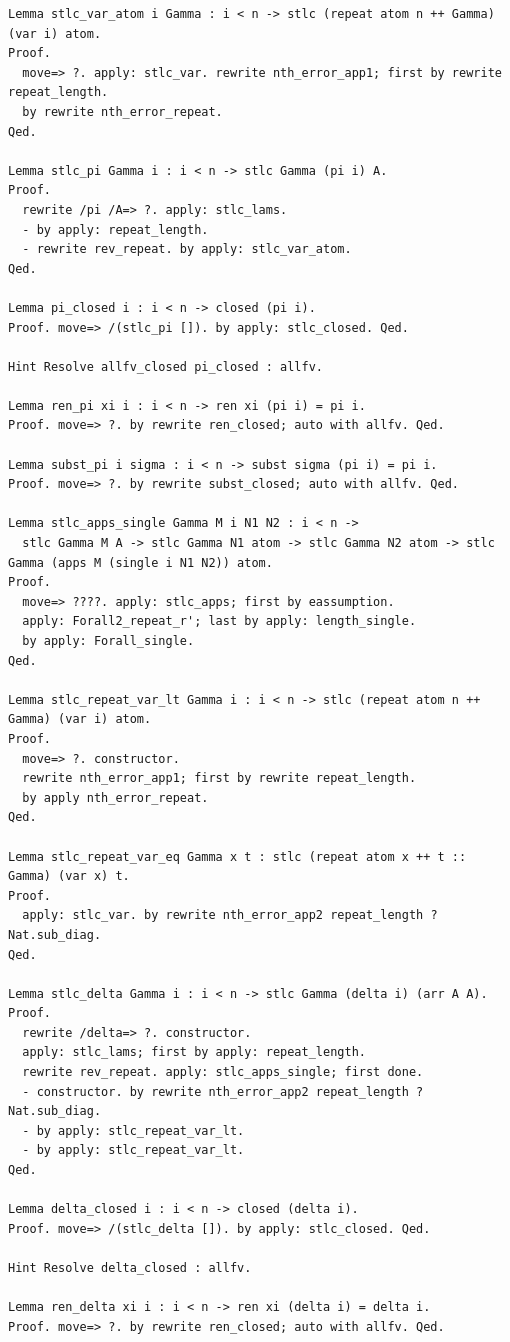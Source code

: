 \begin{lstlisting}
Lemma stlc_var_atom i Gamma : i < n -> stlc (repeat atom n ++ Gamma) (var i) atom.
Proof.
  move=> ?. apply: stlc_var. rewrite nth_error_app1; first by rewrite repeat_length.
  by rewrite nth_error_repeat.
Qed.

Lemma stlc_pi Gamma i : i < n -> stlc Gamma (pi i) A.
Proof.
  rewrite /pi /A=> ?. apply: stlc_lams.
  - by apply: repeat_length.
  - rewrite rev_repeat. by apply: stlc_var_atom.
Qed.

Lemma pi_closed i : i < n -> closed (pi i).
Proof. move=> /(stlc_pi []). by apply: stlc_closed. Qed.

Hint Resolve allfv_closed pi_closed : allfv.

Lemma ren_pi xi i : i < n -> ren xi (pi i) = pi i.
Proof. move=> ?. by rewrite ren_closed; auto with allfv. Qed.

Lemma subst_pi i sigma : i < n -> subst sigma (pi i) = pi i.
Proof. move=> ?. by rewrite subst_closed; auto with allfv. Qed.

Lemma stlc_apps_single Gamma M i N1 N2 : i < n ->
  stlc Gamma M A -> stlc Gamma N1 atom -> stlc Gamma N2 atom -> stlc Gamma (apps M (single i N1 N2)) atom.
Proof.
  move=> ????. apply: stlc_apps; first by eassumption.
  apply: Forall2_repeat_r'; last by apply: length_single.
  by apply: Forall_single.
Qed.

Lemma stlc_repeat_var_lt Gamma i : i < n -> stlc (repeat atom n ++ Gamma) (var i) atom.
Proof.
  move=> ?. constructor.
  rewrite nth_error_app1; first by rewrite repeat_length.
  by apply nth_error_repeat.
Qed.

Lemma stlc_repeat_var_eq Gamma x t : stlc (repeat atom x ++ t :: Gamma) (var x) t.
Proof.
  apply: stlc_var. by rewrite nth_error_app2 repeat_length ?Nat.sub_diag.
Qed.

Lemma stlc_delta Gamma i : i < n -> stlc Gamma (delta i) (arr A A).
Proof.
  rewrite /delta=> ?. constructor.
  apply: stlc_lams; first by apply: repeat_length.
  rewrite rev_repeat. apply: stlc_apps_single; first done.
  - constructor. by rewrite nth_error_app2 repeat_length ?Nat.sub_diag.
  - by apply: stlc_repeat_var_lt.
  - by apply: stlc_repeat_var_lt.
Qed.

Lemma delta_closed i : i < n -> closed (delta i).
Proof. move=> /(stlc_delta []). by apply: stlc_closed. Qed.

Hint Resolve delta_closed : allfv.

Lemma ren_delta xi i : i < n -> ren xi (delta i) = delta i.
Proof. move=> ?. by rewrite ren_closed; auto with allfv. Qed.


\end{lstlisting}
